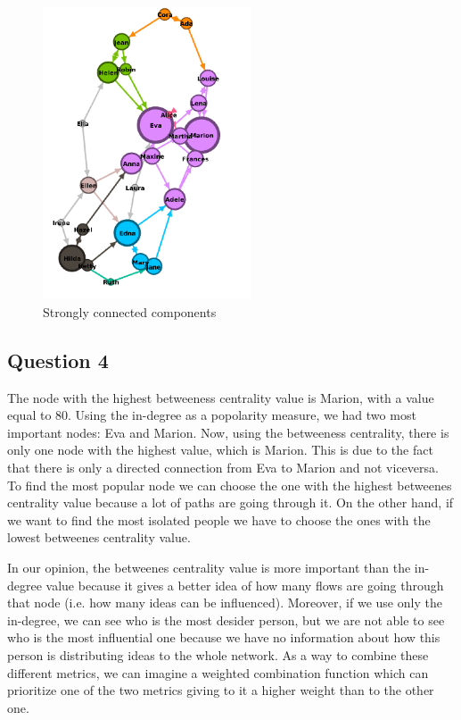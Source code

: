 \documentclass[a4paper]{article}
\begin{document}
\begin{figure}[!htpb]
\centering
\includegraphics[width=0.55\textwidth]{res/img/graph}
\caption{Strongly connected components}
\label{fig:graph}
\end{figure}

\subsection{Question 4}

The node with the highest betweeness centrality value is Marion, with a value equal to 80. Using the in-degree as a popolarity measure, we had two most important nodes: Eva and Marion. Now, using the betweeness centrality, there is only one node with the highest value, which is Marion. This is due to the fact that there is only a directed connection from Eva to Marion and not viceversa. To find the most popular node we can choose the one with the highest betweenes centrality value because a lot of paths are going through it. On the other hand, if we want to find the most isolated people we have to choose the ones with the lowest betweenes centrality value.

In our opinion, the betweenes centrality value is more important than the in-degree value because it gives a better idea of how many flows are going through that node (i.e. how many ideas can be influenced). Moreover, if we use only the in-degree, we can see who is the most desider person, but we are not able to see who is the most influential one because we have no information about how this person is distributing ideas to the whole network.
As a way to combine these different metrics, we can imagine a weighted combination function which can prioritize one of the two metrics giving to it a higher weight than to the other one.
\end{document}
